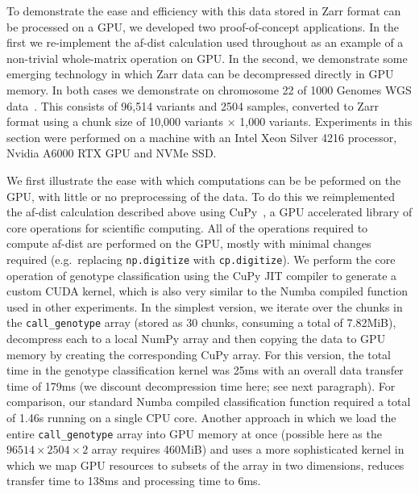 \documentclass[a4paper,num-refs]{oup-contemporary}
\begin{document}
To demonstrate the ease and efficiency with this data stored in Zarr
format can be processed on a GPU, we developed two proof-of-concept
applications. In the first we re-implement the af-dist calculation
used throughout as an example of a non-trivial whole-matrix operation
on GPU. In the second, we demonstrate some emerging technology
in which Zarr data can be decompressed directly in GPU memory.
In both cases we demonstrate on chromosome 22 of
1000 Genomes WGS data~\citep{byrska2022high}. This consists
of 96,514 variants and 2504 samples, converted to Zarr format
using a chunk size of 10,000 variants $\times$ 1,000 variants.
Experiments in this section were performed on a
machine with an Intel Xeon Silver 4216 processor,
Nvidia A6000 RTX GPU and NVMe SSD.

We first illustrate the ease with which computations can be
be peformed on the GPU, with little or no preprocessing of the
data. To do this we reimplemented the af-dist calculation
described above using CuPy~\citep{okuta2017cupy}, a GPU accelerated library
of core operations for scientific computing.
All of the operations required to compute  af-dist are
performed on the GPU, mostly with minimal changes required
(e.g.\ replacing \texttt{np.digitize} with \texttt{cp.digitize}).
We perform the core operation of genotype classification using the
CuPy JIT compiler to generate a custom CUDA kernel, which
is also very similar to the Numba compiled function used in other
experiments. In the simplest version, we iterate over the chunks
in the \texttt{call\_genotype} array (stored as 30 chunks, consuming
a total of 7.82MiB), decompress each to a local
NumPy array and then copying the data to GPU memory by creating
the corresponding CuPy array. For this version, the total time
in the genotype classification kernel was 25ms with an
overall data transfer time of 179ms (we discount decompression
time here; see next paragraph). For comparison,
our standard Numba compiled classification function required
a total of 1.46s running on a single CPU core.
Another approach in which we load the entire
\texttt{call\_genotype} array into GPU memory at once (possible
here as the $96514 \times 2504 \times 2$ array requires
460MiB) and uses
a more sophisticated kernel in which we map GPU resources to
subsets of the array in two dimensions,
reduces transfer
time to 138ms and processing time to 6ms.
\end{document}
